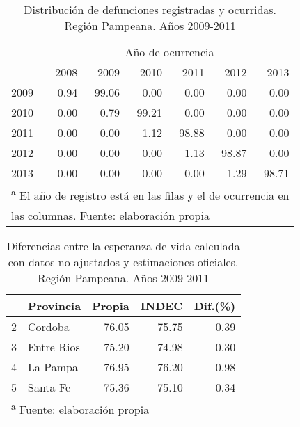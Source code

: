 \documentclass[12pt,spanish,]{article}
\begin{document}
\begin{landscape}\begin{table}

\caption{\label{tab:def_tardias}Distribución de defunciones registradas y ocurridas. Región Pampeana. Años 2009-2011}
\centering
\begin{tabular}[t]{lrrrrrr}
\toprule
\multicolumn{1}{c}{ } & \multicolumn{6}{c}{Año de ocurrencia} \\
\cmidrule(l{3pt}r{3pt}){2-7}
  & 2008 & 2009 & 2010 & 2011 & 2012 & 2013\\
\midrule
2009 & 0.94 & 99.06 & 0.00 & 0.00 & 0.00 & 0.00\\
2010 & 0.00 & 0.79 & 99.21 & 0.00 & 0.00 & 0.00\\
2011 & 0.00 & 0.00 & 1.12 & 98.88 & 0.00 & 0.00\\
2012 & 0.00 & 0.00 & 0.00 & 1.13 & 98.87 & 0.00\\
2013 & 0.00 & 0.00 & 0.00 & 0.00 & 1.29 & 98.71\\
\bottomrule
\multicolumn{7}{l}{\textsuperscript{a} El año de registro está en las filas y el de ocurrencia en}\\
\multicolumn{7}{l}{las columnas. Fuente: elaboración propia}\\
\end{tabular}
\end{table}
\end{landscape}

\begin{landscape}\begin{table}

\caption{\label{tab:Dif_e0_INDEC}Diferencias entre la esperanza de vida calculada con datos no ajustados y estimaciones oficiales. Región Pampeana. Años 2009-2011}
\centering
\begin{tabular}[t]{llrrr}
\toprule
  & Provincia & Propia & INDEC & Dif.(\%)\\
\midrule
2 & Cordoba & 76.05 & 75.75 & 0.39\\
3 & Entre Rios & 75.20 & 74.98 & 0.30\\
4 & La Pampa & 76.95 & 76.20 & 0.98\\
5 & Santa Fe & 75.36 & 75.10 & 0.34\\
\bottomrule
\multicolumn{5}{l}{\textsuperscript{a} Fuente: elaboración propia}\\
\end{tabular}
\end{table}
\end{landscape}
\end{document}
